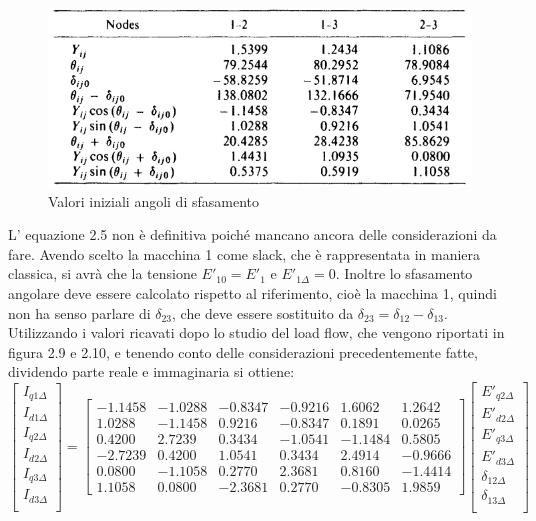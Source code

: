 \documentclass[Lau,noexaminfo]{sapthesis}
\begin{document}
	\begin{figure}
		\centering
		\includegraphics[height=0.25\textheight]{valori_loadflow2}
		\caption{Valori iniziali angoli di sfasamento}
	\end{figure}
	L' equazione 2.5 non è definitiva poiché mancano ancora delle considerazioni da fare. Avendo scelto la macchina 1 come slack, che è rappresentata in maniera classica, si avrà che la tensione $E'_{10}=E'_1$ e $E'_{1\Delta}=0$. Inoltre lo sfasamento angolare deve essere calcolato rispetto al riferimento, cioè la macchina 1, quindi non ha senso parlare di $\delta_{23}$, che deve essere sostituito da $\delta_{23}=\delta_{12}-\delta_{13}$. Utilizzando i valori ricavati dopo lo studio del load flow, che vengono riportati in figura 2.9 e 2.10, e tenendo conto delle considerazioni precedentemente fatte, dividendo parte reale e immaginaria si ottiene:\\
	\begin{equation}
	\begin{bmatrix}
	I_{q1\Delta}\\
	I_{d1\Delta}\\
	I_{q2\Delta}\\
	I_{d2\Delta}\\
	I_{q3\Delta}\\
	I_{d3\Delta}\\
	\end{bmatrix}=
	\begin{bmatrix}
	-1.1458 & -1.0288 & -0.8347 & -0.9216 & 1.6062 & 1.2642\\
	1.0288 & -1.1458 & 0.9216 & -0.8347 & 0.1891 & 0.0265\\
	0.4200 & 2.7239 & 0.3434 & -1.0541 & -1.1484 & 0.5805\\
	-2.7239 & 0.4200 & 1.0541 & 0.3434 & 2.4914 & -0.9666\\
	0.0800 & -1.1058 & 0.2770 & 2.3681 & 0.8160 & -1.4414\\
	1.1058 & 0.0800 & -2.3681 & 0.2770 & -0.8305 & 1.9859
	\end{bmatrix}
	\begin{bmatrix}
	E'_{q2\Delta}\\
	E'_{d2\Delta}\\
	E'_{q3\Delta}\\
	E'_{d3\Delta}\\
	\delta_{12\Delta}\\
	\delta_{13\Delta}\\
	\end{bmatrix}
	\end{equation}
\end{document}
